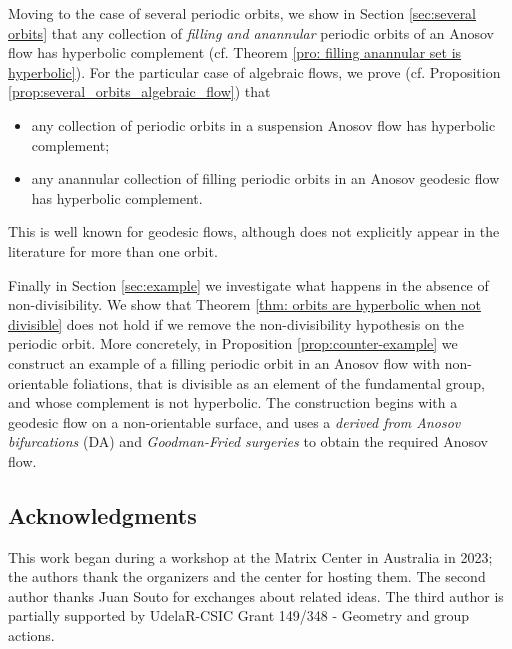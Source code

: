 \documentclass[12pt]{amsart}
\theoremstyle{definition}
\theoremstyle{remark}
\begin{document}


Moving to the case of several periodic orbits, we show in Section \ref{sec:several orbits} that any collection of \emph{filling and anannular} periodic orbits of an Anosov flow has hyperbolic complement (cf. Theorem \ref{pro: filling anannular set is hyperbolic}). For the particular case of algebraic flows, we prove (cf. Proposition \ref{prop:several_orbits_algebraic_flow}) that 
\begin{itemize}
    \item any collection of periodic orbits in a suspension Anosov flow has hyperbolic complement;

    \item any anannular collection of filling periodic orbits in an Anosov geodesic flow has hyperbolic complement.
\end{itemize}
This is well known for geodesic flows, although does not explicitly appear in the literature for more than one orbit.


Finally in Section \ref{sec:example} we investigate what happens in the absence of non-divisibility. We show that Theorem \ref{thm: orbits are hyperbolic when not divisible} does not hold if we remove the non-divisibility hypothesis on the periodic orbit. More concretely, in Proposition \ref{prop:counter-example} we construct an example of a filling periodic orbit in an Anosov flow with non-orientable foliations, that is divisible as an element of the fundamental group, and whose complement is not hyperbolic. The construction begins with a geodesic flow on a non-orientable surface, and uses a \emph{derived from Anosov bifurcations} (DA) and \emph{Goodman-Fried surgeries} to obtain the required Anosov flow.


\subsection*{Acknowledgments}
This work began during a workshop at the Matrix Center in Australia in 2023; the authors thank the organizers and the center for hosting them. The second author thanks Juan Souto for exchanges about related ideas. The third author is partially supported by UdelaR-CSIC Grant 149/348 - Geometry and group actions.
\end{document}
